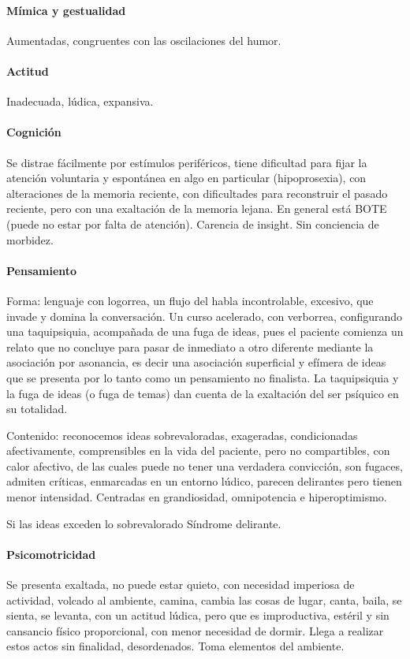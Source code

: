 \paragraph{Mímica y gestualidad}
Aumentadas, congruentes con las oscilaciones del humor.
\paragraph{Actitud}
Inadecuada, lúdica, expansiva.
\paragraph{Cognición}
Se distrae fácilmente por estímulos periféricos, tiene dificultad para fijar la atención voluntaria y espontánea en algo en particular (hipoprosexia), con alteraciones de la memoria reciente, con dificultades para reconstruir el pasado reciente, pero con una exaltación de la memoria lejana. En general está BOTE (puede no estar por falta de atención). Carencia de insight. Sin conciencia de morbidez.
\paragraph{Pensamiento}
Forma: lenguaje con logorrea, un flujo del habla incontrolable, excesivo, que invade y domina la conversación. Un curso acelerado, con verborrea, configurando una taquipsiquia, acompañada de una fuga de ideas, pues el paciente comienza un relato que no concluye para pasar de inmediato a otro diferente mediante la asociación por asonancia, es decir una asociación superficial y efímera de ideas que se presenta por lo tanto como un pensamiento no finalista. La taquipsiquia y la fuga de ideas (o fuga de temas) dan cuenta de la exaltación del ser psíquico en su totalidad.

Contenido: reconocemos ideas sobrevaloradas, exageradas, condicionadas afectivamente, comprensibles en la vida del paciente, pero no compartibles, con calor afectivo, de las cuales puede no tener una verdadera convicción, son fugaces, admiten críticas, enmarcadas en un entorno lúdico, parecen delirantes pero tienen menor intensidad. Centradas en grandiosidad, omnipotencia e hiperoptimismo. 

\faStickyNote Si las ideas exceden lo sobrevalorado \faArrowCircleRight Síndrome delirante.
\paragraph{Psicomotricidad}
Se presenta exaltada, no puede estar quieto, con necesidad imperiosa de actividad, volcado al ambiente, camina, cambia las cosas de lugar, canta, baila, se sienta, se levanta, con un actitud lúdica, pero que es improductiva, estéril y sin cansancio físico proporcional, con menor necesidad de dormir. Llega a realizar estos actos sin finalidad, desordenados. Toma elementos del ambiente.
